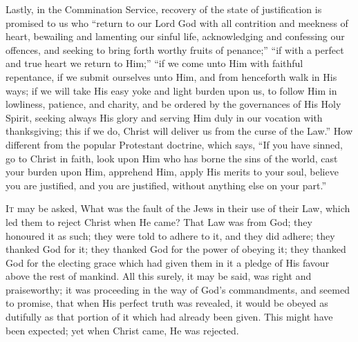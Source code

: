 Lastly, in the Commination Service, recovery of the
state of justification is promised to us who ``return to our Lord
God with all contrition and meekness of heart, bewailing and lamenting
our sinful life, acknowledging and confessing our offences, and
seeking to bring forth worthy fruits of penance;'' ``if with a
perfect and true heart we return to Him;'' ``if we come unto
Him with faithful repentance, if we submit ourselves unto Him, and
from henceforth walk in His ways; if we will take His easy yoke and
light burden upon us, to follow Him in lowliness, patience, and
charity, and be ordered by the governances of His Holy Spirit, seeking
always His glory and serving Him duly in our vocation with
thanksgiving; this if we do, Christ will deliver us from the curse of
the Law.'' How different from the popular Protestant doctrine,
which says, ``If you have sinned, go to Christ in faith, look upon
Him who has borne the sins of the world, cast your burden upon Him,
apprehend Him, apply His merits to your soul, believe you are
justified, and you are justified, without anything else on your
part.''


I\textsc{t} may be asked, What was the fault of the Jews in their use
of their Law, which led them to reject Christ when He came? That Law
was from God; they honoured it as such; they were told to adhere to
it, and they did adhere; they thanked God for it; they thanked God for
the power of obeying it; they thanked God for the electing grace which
had given them in it a pledge of His favour above the rest of mankind.
All this surely, it may be said, was right and praiseworthy; it was
proceeding in the way of God's commandments, and seemed to promise,
that when His perfect truth was revealed, it would be obeyed as
dutifully as that portion of it which had already been given. This
might have been expected; yet when Christ came, He was rejected.

